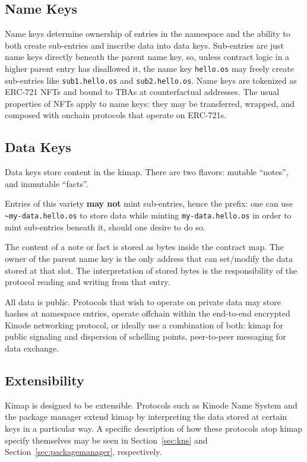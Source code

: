 \documentclass[runningheads]{llncs}
\begin{document}
\subsection{Name Keys}

Name keys determine ownership of entries in the namespace and the ability to both create sub-entries and inscribe data into data keys. Sub-entries are just name keys directly beneath the parent name key, so, unless contract logic in a higher parent entry has disallowed it, the name key \verb|hello.os| may freely create sub-entries like \verb|sub1.hello.os| and \verb|sub2.hello.os|.
Name keys are tokenized as ERC-721 NFTs and bound to TBAs at counterfactual addresses.
The usual properties of NFTs apply to name keys: they may be transferred, wrapped, and composed with onchain protocols that operate on ERC-721s.

\subsection{Data Keys}

Data keys store content in the kimap. There are two flavors: mutable ``notes'', and immutable ``facts''.

Entries of this variety \textbf{may not} mint sub-entries, hence the prefix: one can use \verb|~my-data.hello.os| to store data while minting \verb|my-data.hello.os| in order to mint sub-entries beneath it, should one desire to do so.

The content of a note or fact is stored as bytes inside the contract map.
The owner of the parent name key is the only address that can set/modify the data stored at that slot.
The interpretation of stored bytes is the responsibility of the protocol reading and writing from that entry.

All data is public. Protocols that wish to operate on private data may store hashes at namespace entries, operate offchain within the end-to-end encrypted Kinode networking protocol, or ideally use a combination of both: kimap for public signaling and dispersion of schelling points, peer-to-peer messaging for data exchange.

\subsection{Extensibility}
\label{sec:extensibility}

Kimap is designed to be extensible.
Protocols such as Kinode Name System and the package manager extend kimap by interpreting the data stored at certain keys in a particular way.
A specific description of how these protocols atop kimap specify themselves may be seen in Section~\ref{sec:kns} and Section~\ref{sec:packagemanager}, respectively.
\end{document}
